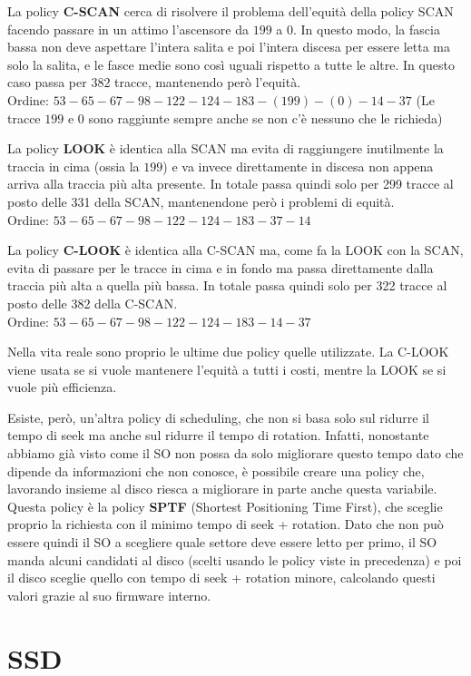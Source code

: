 \documentclass[11pt, a4paper, titlepage, oneside]{scrbook}
\begin{document}
La policy \textbf{C-SCAN} cerca di risolvere il problema dell'equità della policy SCAN facendo passare in un attimo l'ascensore da $199$ a $0$. In questo modo, la fascia bassa non deve aspettare l'intera salita e poi l'intera discesa per essere letta ma solo la salita, e le fasce medie sono così uguali rispetto a tutte le altre. In questo caso passa per 382 tracce, mantenendo però l'equità.  \\
Ordine: $53-65-67-98-122-124-183-(199)-(0)-14-37$ (Le tracce $199$ e $0$ sono raggiunte sempre anche se non c'è nessuno che le richieda)

La policy \textbf{LOOK} è identica alla SCAN ma evita di raggiungere inutilmente la traccia in cima (ossia la $199$) e va invece direttamente in discesa non appena arriva alla traccia più alta presente. In totale passa quindi solo per 299 tracce al posto delle 331 della SCAN, mantenendone però i problemi di equità. \\
Ordine: $53-65-67-98-122-124-183-37-14$

La policy \textbf{C-LOOK} è identica alla C-SCAN ma, come fa la LOOK con la SCAN, evita di passare per le tracce in cima e in fondo ma passa direttamente dalla traccia più alta a quella più bassa. In totale passa quindi solo per 322 tracce al posto delle 382 della C-SCAN. \\
Ordine: $53-65-67-98-122-124-183-14-37$

Nella vita reale sono proprio le ultime due policy quelle utilizzate. La C-LOOK viene usata se si vuole mantenere l'equità a tutti i costi, mentre la LOOK se si vuole più efficienza.

Esiste, però, un'altra policy di scheduling, che non si basa solo sul ridurre il tempo di seek ma anche sul ridurre il tempo di rotation. Infatti, nonostante abbiamo già visto come il SO non possa da solo migliorare questo tempo dato che dipende da informazioni che non conosce, è possibile creare una policy che, lavorando insieme al disco riesca a migliorare in parte anche questa variabile. Questa policy è la policy \textbf{SPTF} (Shortest Positioning Time First), che sceglie proprio la richiesta con il minimo tempo di seek + rotation. Dato che non può essere quindi il SO a scegliere quale settore deve essere letto per primo, il SO manda alcuni candidati al disco (scelti usando le policy viste in precedenza) e poi il disco sceglie quello con tempo di seek + rotation minore, calcolando questi valori grazie al suo firmware interno.

\section{SSD}
\end{document}
